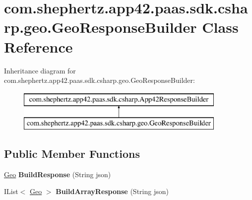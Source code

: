 \hypertarget{classcom_1_1shephertz_1_1app42_1_1paas_1_1sdk_1_1csharp_1_1geo_1_1_geo_response_builder}{\section{com.\+shephertz.\+app42.\+paas.\+sdk.\+csharp.\+geo.\+Geo\+Response\+Builder Class Reference}
\label{classcom_1_1shephertz_1_1app42_1_1paas_1_1sdk_1_1csharp_1_1geo_1_1_geo_response_builder}
}
Inheritance diagram for com.\+shephertz.\+app42.\+paas.\+sdk.\+csharp.\+geo.\+Geo\+Response\+Builder\+:\begin{figure}[H]
\begin{center}
\leavevmode
\includegraphics[height=2.000000cm]{classcom_1_1shephertz_1_1app42_1_1paas_1_1sdk_1_1csharp_1_1geo_1_1_geo_response_builder}
\end{center}
\end{figure}
\subsection*{Public Member Functions}
\begin{DoxyCompactItemize}
\item 
\hypertarget{classcom_1_1shephertz_1_1app42_1_1paas_1_1sdk_1_1csharp_1_1geo_1_1_geo_response_builder_a24280ae0ba23e49da68a53f59394edc5}{\hyperlink{classcom_1_1shephertz_1_1app42_1_1paas_1_1sdk_1_1csharp_1_1geo_1_1_geo}{Geo} {\bfseries Build\+Response} (String json)}\label{classcom_1_1shephertz_1_1app42_1_1paas_1_1sdk_1_1csharp_1_1geo_1_1_geo_response_builder_a24280ae0ba23e49da68a53f59394edc5}

\item 
\hypertarget{classcom_1_1shephertz_1_1app42_1_1paas_1_1sdk_1_1csharp_1_1geo_1_1_geo_response_builder_a4b6bdc94016c675cbc8da1f6da1b24dc}{I\+List$<$ \hyperlink{classcom_1_1shephertz_1_1app42_1_1paas_1_1sdk_1_1csharp_1_1geo_1_1_geo}{Geo} $>$ {\bfseries Build\+Array\+Response} (String json)}\label{classcom_1_1shephertz_1_1app42_1_1paas_1_1sdk_1_1csharp_1_1geo_1_1_geo_response_builder_a4b6bdc94016c675cbc8da1f6da1b24dc}

\end{DoxyCompactItemize}
